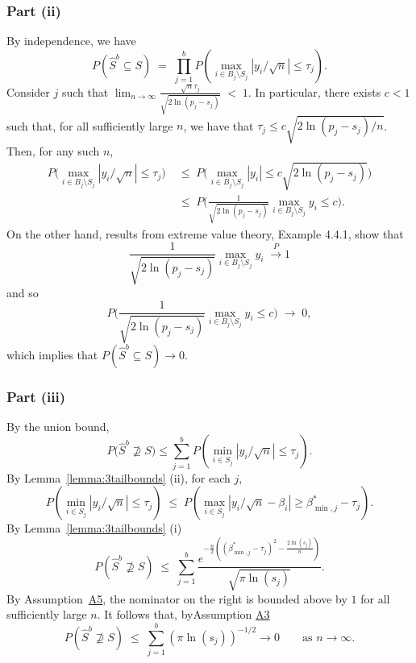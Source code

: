 \documentclass[bj,authoryear]{imsart}
\theoremstyle{plain}
\begin{document}
\subsubsection{Part (ii)}  By independence, we have 
$$P(\hat{S}^{b} \subseteq S)\;=\;\prod_{j=1}^b P(\max_{i \in B_j\setminus S_j}|y_i/\sqrt{n}| \leq \tau_j).$$ 
Consider $j$ such that $\lim_{n\to \infty} \frac{\sqrt{n}\tau_j}{\sqrt{2\ln(p_j-s_j)}} \;<\;1$. In particular, there exists $c<1$ such that, for all sufficiently large $n$, we have that $\tau_j\leq c\sqrt{2\ln(p_j-s_j)/n}$. Then, for any such $n$,
\begin{align*}
    P\Big(\max_{i \in B_j\setminus S_j}|y_i/\sqrt{n}| \leq \tau_j\Big)&\;\leq\; P\Big(\max_{i \in B_j\setminus S_j}|y_i| \leq c \sqrt{2\ln(p_j-s_j)}\Big)\\&\;\leq\;P\Big(\tfrac{1}{\sqrt{2\ln(p_j-s_j)}}\max_{i \in B_j\setminus S_j}y_i \leq c \Big).
\end{align*}
On the other hand, results from extreme value theory, \cite{galambos} Example 4.4.1, show that 
 $$\frac{1}{\sqrt{2 \ln(p_j-s_j)}}\max_{i\in B_j\setminus S_j}y_i \;\overset{P}{\longrightarrow} 1$$
 and so 
 $$
 P\Big(\frac{1}{\sqrt{2\ln(p_j-s_j)}}\max_{i \in B_j\setminus S_j}y_i \leq c \Big)\;\to\;0,
 $$ 
 which implies that $P(\hat{S}^{b} \subseteq S)\to 0$. 

\subsubsection{Part (iii)}
	 By the union bound, 
	$$P\big(\hat{S}^{b} \not\supseteq S\big)\leq \sum_{j=1}^b  P\left(\min_{i\in S_j}|y_i/\sqrt{n}|\leq\tau_j\right).$$ 
	By Lemma~\ref{lemma:3tailbounds} (ii), for each $j$,	
	$$P\left(\min_{i\in S_j}|y_i/\sqrt{n}|\leq\tau_j\right)\;\leq\; P\left(\max_{i\in S_j}|y_i/\sqrt{n}-\beta_i| \geq\beta_{\min,j}^*-\tau_j \right).$$ By Lemma~\ref{lemma:3tailbounds} (i)  
	\begin{equation}\label{eq:type2convrate}
P\left(\hat{S}^{b}\not\supseteq S \right) \;\leq\;\sum_{j=1}^b\frac{e^{-\tfrac{n}{2}\left((\beta^*_{\min,j}-\tau_j)^2-\tfrac{2\ln(s_j)}{n}\right)}}{\sqrt{\pi\ln(s_j)}}.		
	\end{equation}
 By Assumption~\hyperlink{lab:A5}{A5}, the nominator on the right is bounded above by $1$ for all sufficiently large $n$. It follows that, byAssumption  \hyperlink{lab:A3}{A3} 
	$$P\left(\hat{S}^{b} \not\supseteq S \right) \;\leq\;  \sum_{j=1}^b (\pi\ln (s_j))^{-1/2} \to 0\qquad \mbox{as } n\to \infty.$$ 
\end{document}
